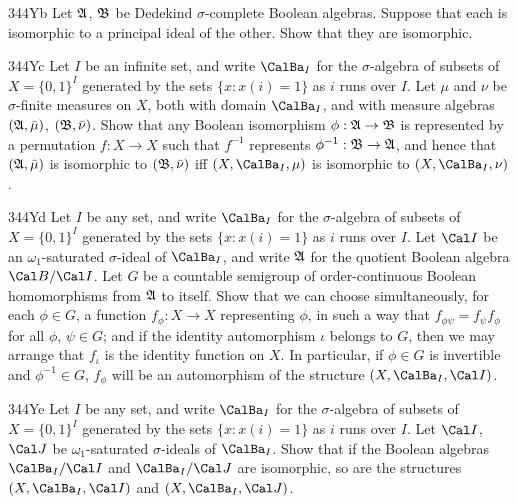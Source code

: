 {\spheader 344Yb Let $\frak A$, $\frak B$ be Dedekind $\sigma$-complete
Boolean algebras.   Suppose that each is isomorphic to a principal ideal
of the other.   Show that they are isomorphic.

\spheader 344Yc Let $I$ be an infinite set, and
write $\CalBa_I$ for the $\sigma$-algebra of subsets of $X=\{0,1\}^I$
generated by the sets $\{x:x(i)=1\}$ as $i$ runs over $I$.   Let
$\mu$ and $\nu$ be $\sigma$-finite measures on $X$, both with domain
$\CalBa_I$, and with measure algebras $(\frak A,\bar\mu)$,
$(\frak B,\bar\nu)$.   Show that any Boolean isomorphism
$\phi:\frak A\to\frak B$ is represented by a permutation $f:X\to X$ such
that $f^{-1}$ represents $\phi^{-1}:\frak B\to\frak A$, and hence that
$(\frak A,\bar\mu)$ is isomorphic to $(\frak B,\bar\nu)$ iff
$(X,\CalBa_I,\mu)$ is isomorphic to $(X,\CalBa_I,\nu)$.

\spheader 344Yd Let $I$ be any set, and write $\CalBa_I$ for the
$\sigma$-algebra of subsets of $X=\{0,1\}^I$ generated by the sets
$\{x:x(i)=1\}$ as $i$
runs over $I$.   Let $\Cal I$ be an $\omega_1$-saturated $\sigma$-ideal of
$\CalBa_I$,
and write $\frak A$ for the quotient Boolean algebra
$\Cal B/\Cal I$.   Let $G$ be a countable semigroup of order-continuous
Boolean homomorphisms from $\frak A$ to itself.   Show that we can
choose simultaneously, for each $\phi\in G$, a function $f_{\phi}:X\to
X$ representing $\phi$, in such a way that
$f_{\phi\psi}=f_{\psi}f_{\phi}$
for all $\phi$, $\psi\in G$;  and if the identity automorphism $\iota$
belongs to $G$, then we may arrange that $f_{\iota}$ is the identity
function on $X$.   In particular, if $\phi\in G$ is invertible and
$\phi^{-1}\in G$, $f_{\phi}$ will be an automorphism of the structure
$(X,\CalBa_I,\Cal I)$.

\spheader 344Ye Let $I$ be any set, and write $\CalBa_I$ for the
$\sigma$-algebra of subsets of $X=\{0,1\}^I$ generated by the sets
$\{x:x(i)=1\}$ as $i$
runs over $I$.   Let $\Cal I$, $\Cal J$ be $\omega_1$-saturated
$\sigma$-ideals of $\CalBa_I$.
Show that if the Boolean algebras $\CalBa_I/\Cal I$
and $\CalBa_I/\Cal J$ are isomorphic, so are the structures
$(X,\CalBa_I,\Cal I)$ and $(X,\CalBa_I,\Cal J)$.
}%

